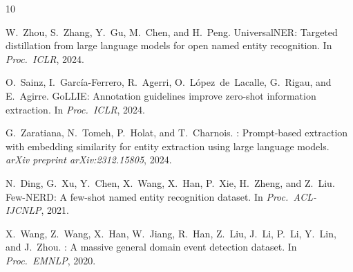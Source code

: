 \documentclass[11pt,a4paper]{article}
\begin{document}



\begin{thebibliography}{10}

W.~Zhou, S.~Zhang, Y.~Gu, M.~Chen, and H.~Peng.
\newblock Universal{NER}: Targeted distillation from large language models for open named entity recognition.
\newblock In \emph{Proc.\ ICLR}, 2024.

O.~Sainz, I.~Garc{\'i}a-Ferrero, R.~Agerri, O.~L{\'o}pez~de~Lacalle, G.~Rigau, and E.~Agirre.
\newblock Go{LLIE}: Annotation guidelines improve zero-shot information extraction.
\newblock In \emph{Proc.\ ICLR}, 2024.

G.~Zaratiana, N.~Tomeh, P.~Holat, and T.~Charnois.
: Prompt-based extraction with embedding similarity for entity extraction using large language models.
\newblock \emph{arXiv preprint arXiv:2312.15805}, 2024.

N.~Ding, G.~Xu, Y.~Chen, X.~Wang, X.~Han, P.~Xie, H.~Zheng, and Z.~Liu.
\newblock Few-{NERD}: A few-shot named entity recognition dataset.
\newblock In \emph{Proc.\ ACL-IJCNLP}, 2021.

X.~Wang, Z.~Wang, X.~Han, W.~Jiang, R.~Han, Z.~Liu, J.~Li, P.~Li, Y.~Lin, and J.~Zhou.
: A massive general domain event detection dataset.
\newblock In \emph{Proc.\ EMNLP}, 2020.

\end{thebibliography}
\end{document}
